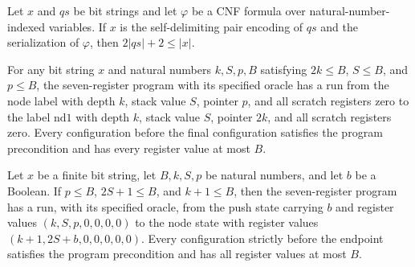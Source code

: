 \begin{lemma}
\label{Complexity.LogProg.TQBFARM.length_enc}
\leanok
{}
Let $x$ and $qs$ be bit strings and let $\varphi$ be a CNF formula over
natural-number-indexed variables. If $x$ is the self-delimiting pair encoding of $qs$
and the serialization of $\varphi$, then $2|qs|+2\leq |x|$.
\end{lemma}

\begin{theorem}
\label{Complexity.LogProg.TQBFARM.node_run}
\leanok
{}
For any bit string $x$ and natural numbers $k,S,p,B$ satisfying $2k\le B$, $S\le B$, and
$p\le B$, the seven-register program with its specified oracle has a run from the node
label with depth $k$, stack value $S$, pointer $p$, and all scratch registers zero to
the label $\mathrm{nd1}$ with depth $k$, stack value $S$, pointer $2k$, and all scratch
registers zero. Every configuration before the final configuration satisfies the program
precondition and has every register value at most $B$.
\end{theorem}

\begin{theorem}
\label{Complexity.LogProg.TQBFARM.push_run}
\leanok
{}
Let $x$ be a finite bit string, let $B,k,S,p$ be natural numbers, and let $b$ be a
Boolean. If $p\le B$, $2S+1\le B$, and $k+1\le B$, then the seven-register program has a
run, with its specified oracle, from the push state carrying $b$ and register values
$(k,S,p,0,0,0,0)$ to the node state with register values $(k+1,2S+b,0,0,0,0,0)$. Every
configuration strictly before the endpoint satisfies the program precondition and has
all register values at most $B$.
\end{theorem}

